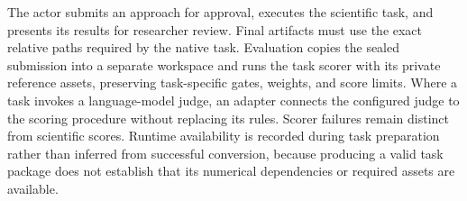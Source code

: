 The actor submits an approach for approval, executes the scientific task,
and presents its results for researcher review. Final artifacts must use
the exact relative paths required by the native task. Evaluation copies the
sealed submission into a separate workspace and runs the task scorer
with its private reference assets, preserving task-specific gates, weights,
and score limits. Where a task invokes a language-model judge, an adapter
connects the configured judge to the scoring procedure without
replacing its rules. Scorer failures remain distinct from scientific scores.
Runtime availability is recorded during task preparation rather than inferred
from successful conversion, because producing a valid task package does not
establish that its numerical dependencies or required assets are available.




